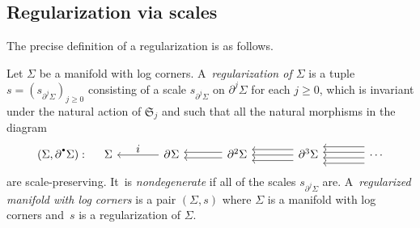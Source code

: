 \documentclass[10pt]{amsart}
\let\oldbullet\bullet
\renewcommand{\bullet}{{\raisebox{1pt}{$\scriptscriptstyle\oldbullet$}}}
\let\tst\textstyle
\theoremstyle{definition}
\theoremstyle{remark}
\let\defn\emph
\renewcommand{\ge}{\geqslant}
\newcommand{\Sig}{\Sigma}
\newcommand{\bdSig}[1][]{\partial^{#1}\Sigma}
\newcommand{\symgp}[1]{\mathfrak{S}_{#1}}
\begin{document}
\subsection{Regularization via scales}
The precise definition of a regularization is as follows.

\begin{definition}\label{def:regularization}
Let $\Sig$ be a manifold with log corners. A~\defn{regularization of $\Sig$} is a tuple $s = (s_{\bdSig[j]})_{j \ge 0}$ consisting of a scale $s_{\bdSig[j]}$ on $\bdSig[j]$ for each $j \ge 0$, which is invariant under the natural action of $\symgp{j}$ and such that all the natural morphisms in the diagram\vspace*{-3pt}
\[
\begin{tikzcd}[column sep = .8cm, row sep = 1cm,baseline=-0.9cm]
(\Sig,\bdSig[\bullet]): &[-.5cm] \Sig &[.5cm] \bdSig \ar[l,"\tst i"'] &[.4cm] \bdSig[2] \ar[l,shift left] \ar[l,shift right] &[.5cm] \bdSig[3] \ar[l,shift left = 2]\ar[l,shift left = 0]\ar[l,shift left = -2] &[.5cm] \cdots \ar[l,shift left = 3]\ar[l,shift left = 1]\ar[l,shift left = -1]\ar[l,shift left = -3]
\end{tikzcd}
\]
are scale-preserving. It~is \defn{nondegenerate} if all of the scales $s_{\partial^j\Sig}$ are. A~\defn{regularized manifold with log corners} is a pair $(\Sig,s)$ where $\Sig$ is a manifold with log corners and~$s$ is a regularization of $\Sig$.
\end{definition}
\end{document}
